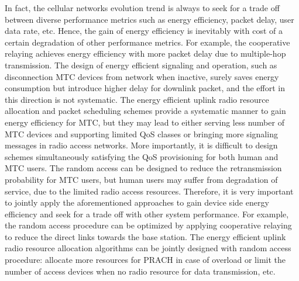 In fact, the cellular networks evolution trend is always to seek for a trade off between diverse performance metrics such as energy efficiency, packet delay, user data rate, etc. Hence, the gain of energy efficiency is inevitably with cost of a certain degradation of other performance metrics. For example, the cooperative relaying achieves energy efficiency with more packet delay due to multiple-hop transmission. The design of energy efficient signaling and operation, such as disconnection MTC devices from network when inactive, surely saves energy consumption but introduce higher delay for downlink packet, and the effort in this direction is not systematic. The energy efficient uplink radio resource allocation and packet scheduling schemes provide a systematic manner to gain energy efficiency for MTC, but they may lead to either serving less number of MTC devices and supporting limited QoS classes or bringing more signaling messages in radio access networks. More importantly, it is difficult to design schemes simultaneously satisfying the QoS provisioning for both human and MTC users. The random access can be designed to reduce the retransmission probability for MTC users, but human users may suffer from degradation of service, due to the limited radio access resources. Therefore, it is very important to jointly apply the aforementioned approaches to gain device side energy efficiency and seek for a trade off with other system performance. For example, the random access procedure can be optimized by applying cooperative relaying to reduce the direct links towards the base station. The energy efficient uplink radio resource allocation algorithms can be jointly designed with random access procedure: allocate more resources for PRACH in case of overload or limit the number of access devices when no radio resource for data transmission, etc.


